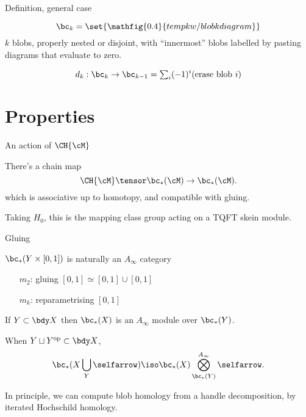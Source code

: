 \documentclass[beamer, compress]{beamer}
\begin{document}
\begin{frame}{Definition, general case}
\begin{block}{}
$$\bc_k = \set{\mathfig{0.4}{tempkw/blobkdiagram}}$$
$k$ blobs, properly nested or disjoint, with ``innermost'' blobs labelled by pasting diagrams that evaluate to zero.
\end{block}
\begin{block}{}
\vspace{-2mm}
$$d_k : \bc_k \to \bc_{k-1} = {\textstyle \sum_i} (-1)^i (\text{erase blob $i$})$$
\end{block}
\end{frame}

\section{Properties}
\begin{frame}{An action of $\CH{\cM}$}
\begin{thm}
There's a chain map
$$\CH{\cM} \tensor \bc_*(\cM) \to \bc_*(\cM).$$
which is associative up to homotopy, and compatible with gluing.
\end{thm}
\begin{block}{}
Taking $H_0$, this is the mapping class group acting on a TQFT skein module.
\end{block}
\end{frame}

\begin{frame}{Gluing}
\begin{block}{$\bc_*(Y \times [0,1])$ is naturally an $A_\infty$ category}
\begin{itemize}
\item[$m_2$:] gluing $[0,1] \simeq [0,1] \cup [0,1]$
\item[$m_k$:] reparametrising $[0,1]$
\end{itemize}
\end{block}
\begin{block}{}
If $Y \subset \bdy X$ then $\bc_*(X)$ is an $A_\infty$ module over $\bc_*(Y)$.
\end{block}
\begin{thm}
When $Y \sqcup Y^{\text{op}} \subset \bdy X$,
\vspace{-5mm}
\[
	\bc_*(X \bigcup_Y \selfarrow) \iso \bc_*(X) \bigotimes_{\bc_*(Y)}^{A_\infty} \selfarrow.
\]
\end{thm}
In principle, we can compute blob homology from a handle decomposition, by iterated Hochschild homology.
\end{frame}
\end{document}
